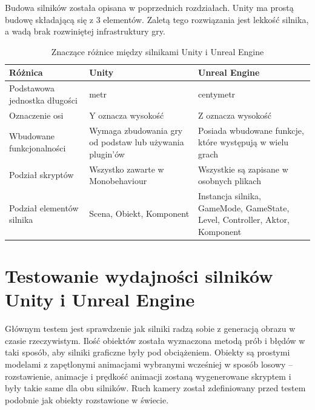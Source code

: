 \documentclass[12pt,twoside]{article}
\begin{document}
Budowa silników została opisana w poprzednich rozdziałach. Unity ma prostą
budowę składającą się z 3 elementów. Zaletą tego rozwiązania jest lekkość
silnika, a wadą brak rozwiniętej infrastruktury gry. 



\begin{table}[ht]
\caption{Znaczące różnice między silnikami Unity i Unreal Engine}
\centering		
	\begin{tabular}{|p{3cm}|p{}|p{}|}	
		\hline
		Różnica & Unity & Unreal Engine  \\
		\hline
		Podstawowa jednostka długości & metr & centymetr \\
		\hline
		Oznaczenie osi & Y oznacza wysokość & Z oznacza wysokość \\
		\hline
		Wbudowane funkcjonalności & Wymaga zbudowania gry od podstaw lub
		używania plugin’ów & Posiada wbudowane funkcje, które występują w wielu
		grach \\
		\hline
        Podział skryptów & Wszystko zawarte w Monobehaviour & Wszystkie
        są zapisane w osobnych plikach \\
        \hline
        Podział elementów silnika & Scena, Obiekt, Komponent & Instancja
        silnika, GameMode, GameState, Level, Controller, Aktor, Komponent \\
        \hline
	\end{tabular}	
	
\label{Tabela:RozniceMiedzySIlnikami}
\end{table}	






\clearpage	
\section{Testowanie wydajności silników Unity i Unreal Engine}


Głównym testem jest sprawdzenie jak silniki radzą sobie z generacją obrazu w
czasie rzeczywistym. Ilość obiektów została wyznaczona metodą prób i błędów w
taki sposób, aby silniki graficzne były pod obciążeniem. Obiekty są prostymi
modelami z zapętlonymi animacjami wybranymi wcześniej w sposób losowy –
rozstawienie, animacje i prędkość animacji zostaną wygenerowane skryptem i były
takie same dla obu silników. Ruch kamery został zdefiniowany przed testem
podobnie jak obiekty rozstawione w świecie. 
\end{document}
